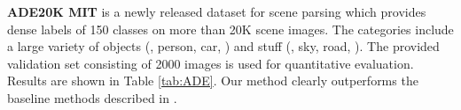 \documentclass[10pt,twocolumn,letterpaper]{article}
\newcommand{\myparagraph}[1]{\vspace{.5em}\noindent\textbf{#1}}
\begin{document}
\begin{table}[t]
\caption{Segmentation results on SUN-RGBD dataset (37 classes).
We compare to a number of recent methods.
Our RefineNet significantly outperforms the existing methods.}
\centering
{}
\label{tab:sunrgbd}
\end{table}\myparagraph{ADE20K MIT}\cite{ZhouZPFBT16} is a newly released dataset for scene parsing which provides dense labels of 150 classes on more than 20K scene images. The categories include a large variety of objects (\eg, person, car, \etc) and stuff (\eg, sky, road, \etc). The provided validation set consisting of 2000 images is used for quantitative evaluation. Results are shown in Table \ref{tab:ADE}. 
Our method clearly outperforms the baseline methods described in \cite{ZhouZPFBT16}.
\end{document}
